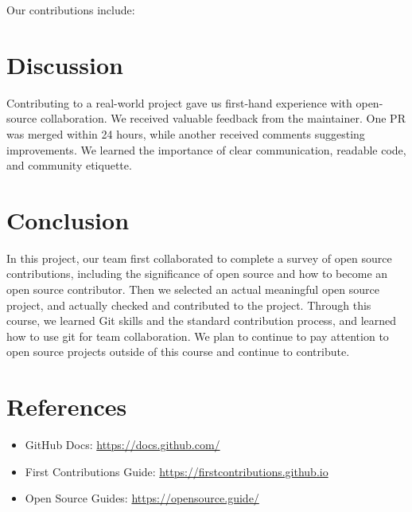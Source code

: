 \documentclass[12pt]{article}
\begin{document}
Our contributions include:


\section{Discussion}

Contributing to a real-world project gave us first-hand experience with open-source collaboration. We received valuable feedback from the maintainer. One PR was merged within 24 hours, while another received comments suggesting improvements. We learned the importance of clear communication, readable code, and community etiquette.

\section{Conclusion}
In this project, our team first collaborated to complete a survey of open source contributions, including the significance of open source and how to become an open source contributor. Then we selected an actual meaningful open source project, and actually checked and contributed to the project. Through this course, we learned Git skills and the standard contribution process, and learned how to use git for team collaboration. We plan to continue to pay attention to open source projects outside of this course and continue to contribute.


\section*{References}
\begin{itemize}
    \item GitHub Docs: \url{https://docs.github.com/}
    \item First Contributions Guide: \url{https://firstcontributions.github.io}
    \item Open Source Guides: \url{https://opensource.guide/}
\end{itemize}
\end{document}
